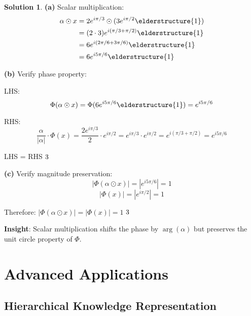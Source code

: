 \documentclass[12pt,a4paper]{article}
\newcommand{\checkmark}{\ding{51}}
\theoremstyle{definition}
\newtheorem{solution}{Solution}[section]
\theoremstyle{remark}
\begin{document}
\begin{solution}
\textbf{(a)} Scalar multiplication:
\begin{align}
\alpha \odot x &= 2e^{i\pi/3} \odot (3e^{i\pi/2} \elderstructure{1}) \\
&= (2 \cdot 3) e^{i(\pi/3 + \pi/2)} \elderstructure{1} \\
&= 6e^{i(2\pi/6 + 3\pi/6)} \elderstructure{1} \\
&= 6e^{i5\pi/6} \elderstructure{1}
\end{align}

\textbf{(b)} Verify phase property:

LHS:
$$\Phi(\alpha \odot x) = \Phi(6e^{i5\pi/6} \elderstructure{1}) = e^{i5\pi/6}$$

RHS:
$$\frac{\alpha}{|\alpha|} \cdot \Phi(x) = \frac{2e^{i\pi/3}}{2} \cdot e^{i\pi/2} = e^{i\pi/3} \cdot e^{i\pi/2} = e^{i(\pi/3 + \pi/2)} = e^{i5\pi/6}$$

LHS = RHS $\checkmark$

\textbf{(c)} Verify magnitude preservation:
$$|\Phi(\alpha \odot x)| = |e^{i5\pi/6}| = 1$$
$$|\Phi(x)| = |e^{i\pi/2}| = 1$$

Therefore: $|\Phi(\alpha \odot x)| = |\Phi(x)| = 1$ $\checkmark$

\textbf{Insight}: Scalar multiplication shifts the phase by $\arg(\alpha)$ but preserves the unit circle property of $\Phi$.
\end{solution}

\newpage
\section{Advanced Applications}

\subsection{Hierarchical Knowledge Representation}
\end{document}
